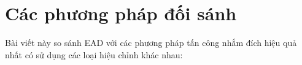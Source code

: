 \section{Các phương pháp đối sánh}
Bài viết này so sánh EAD với các phương pháp tấn công nhắm đích hiệu quả nhất có sử dụng 
các loại hiệu chỉnh khác nhau: